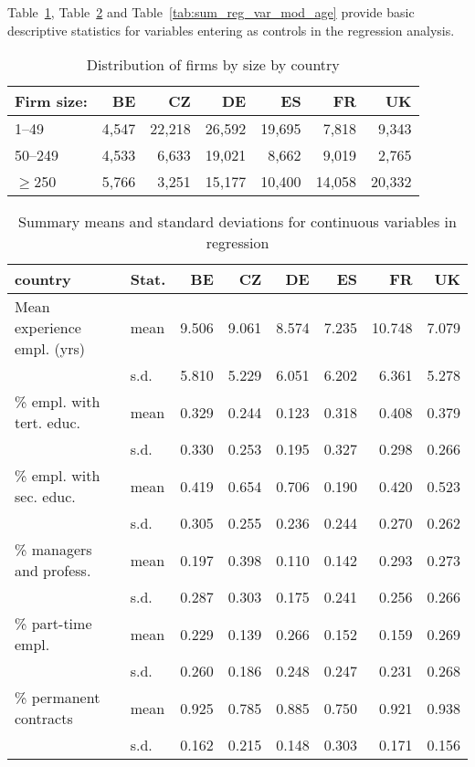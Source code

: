 \documentclass[12pt]{article}
\begin{document}
\bigskip

\noindent Table~\ref{tab:firm_size}, Table~\ref{tab:sum_reg_var_cont} and Table~\ref{tab:sum_reg_var_mod_age} provide basic descriptive statistics for variables entering as controls in the regression analysis.

\begin{table}[ht]
\centering
\small
\caption{Distribution of firms by size by country}
\label{tab:firm_size}
\begin{tabular}{lrrrrrr}
\toprule
Firm size: & BE    & CZ     & DE     & ES     & FR     & UK     \\
\midrule
1--49      & 4,547 & 22,218 & 26,592 & 19,695 & 7,818  & 9,343  \\
50--249    & 4,533 & 6,633  & 19,021 & 8,662  & 9,019  & 2,765  \\
$\geq$250  & 5,766 & 3,251  & 15,177 & 10,400 & 14,058 & 20,332 \\
\bottomrule
\end{tabular}

 \end{table}

\begin{table}[htp]
\caption{Summary means and standard deviations for continuous variables in regression}
\label{tab:sum_reg_var_cont}
\centering
\small
\begin{tabular}{llrrrrrr}
\toprule
country                     & Stat. & BE    & CZ    & DE    & ES    & FR     & UK    \\
\midrule
Mean experience empl. (yrs) & mean & 9.506 & 9.061 & 8.574 & 7.235 & 10.748 & 7.079 \\
                            & s.d. & 5.810 & 5.229 & 6.051 & 6.202 & 6.361  & 5.278 \\[1ex]
\% empl. with tert. educ.   & mean & 0.329 & 0.244 & 0.123 & 0.318 & 0.408  & 0.379 \\
                            & s.d. & 0.330 & 0.253 & 0.195 & 0.327 & 0.298  & 0.266 \\[1ex]
\% empl. with sec. educ.    & mean & 0.419 & 0.654 & 0.706 & 0.190 & 0.420  & 0.523 \\
                            & s.d. & 0.305 & 0.255 & 0.236 & 0.244 & 0.270  & 0.262 \\[1ex]
\% managers and profess.    & mean & 0.197 & 0.398 & 0.110 & 0.142 & 0.293  & 0.273 \\
                            & s.d. & 0.287 & 0.303 & 0.175 & 0.241 & 0.256  & 0.266 \\[1ex]
\% part-time empl.          & mean & 0.229 & 0.139 & 0.266 & 0.152 & 0.159  & 0.269 \\
                            & s.d. & 0.260 & 0.186 & 0.248 & 0.247 & 0.231  & 0.268 \\[1ex]
\% permanent contracts      & mean & 0.925 & 0.785 & 0.885 & 0.750 & 0.921  & 0.938 \\
                            & s.d. & 0.162 & 0.215 & 0.148 & 0.303 & 0.171  & 0.156 \\
\bottomrule                            
\end{tabular}

 \end{table}
\end{document}
